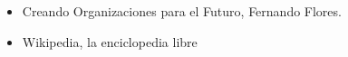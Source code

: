\begin{itemize}
	\item Creando Organizaciones para el Futuro, Fernando Flores.
	\item Wikipedia, la enciclopedia libre
\end{itemize}

